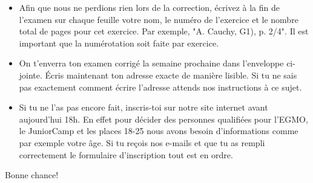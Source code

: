 \documentclass[12pt,a4paper]{article}
\begin{document}
\begin{itemize}

\item Afin que nous ne perdions rien lors de la correction, écrivez à la fin de l'examen sur chaque feuille votre nom, le numéro de l'exercice et le nombre total de pages pour cet exercice. Par exemple, "A. Cauchy, G1), p. 2/4". Il est important que la numérotation soit faite par exercice.

\item On t'enverra ton examen corrigé la semaine prochaine dans l'enveloppe ci-jointe. Écris maintenant ton adresse exacte de manière lisible. Si tu ne sais pas exactement comment écrire l'adresse attends nos instructions à ce sujet.

\item Si tu ne l'as pas encore fait, inscris-toi sur notre site internet avant aujourd'hui 18h. En effet pour décider des personnes qualifiées pour l'EGMO, le JuniorCamp et les places 18-25 nous avons besoin d'informations comme par exemple votre âge. Si tu reçois nos e-mails et que tu as rempli correctement le formulaire d'inscription tout est en ordre.
\end{itemize}

\vfill

\begin{center}
Bonne chance!
\end{center}
\end{document}
